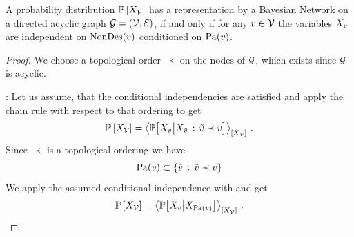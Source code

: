 \begin{theorem}
    \label{the:condIndBN}
    A probability distribution $\mathbb{P}\left[X_{\mathcal{V}}\right]$ has a representation by a Bayesian Network on a directed acyclic graph $\mathcal{G}=(\mathcal{V},\mathcal{E})$, if and only if for any $v\in\mathcal{V}$ the variables $X_{v}$ are independent on $\mathrm{NonDes}(v)$ conditioned on $\mathrm{Pa}(v)$.
\end{theorem}
\begin{proof}
    We choose a topological order $\prec$ on the nodes of $\mathcal{G}$, which exists since $\mathcal{G}$ is acyclic.

    \proofrightsymbol:
    Let us assume, that the conditional independencies are satisfied and apply the chain rule with respect to that ordering to get
    \begin{align*}
        \mathbb{P}\left[X_{\mathcal{V}}\right] =
        \left\langle 
            \mathbb{P}\big[X_{v}\big|X_{\tilde{v}} \,:\, \tilde{v} \prec v\big]
        \right\rangle_{\left[ X_{\mathcal{V}} \right]} \, .
    \end{align*}
    Since $\prec$ is a topological ordering we have
    \[ \mathrm{Pa}(v) \subset \{\tilde{v} \,:\, \tilde{v} \prec v\} \]
    We apply the assumed conditional independence with  and get
    \begin{align*}
        \mathbb{P}\left[X_{\mathcal{V}}\right] =
        \left\langle 
            \mathbb{P}\big[X_{v}\big|X_{\mathrm{Pa}(v)}\big]
        \right\rangle_{\left[ X_{\mathcal{V}} \right]} \, .
    \end{align*}


\end{proof}
